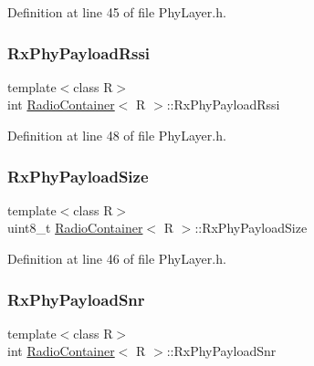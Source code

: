 Definition at line 45 of file Phy\+Layer.\+h.

\mbox{\label{class_radio_container_a198c252436c6a365cb07d9d073d9d50d}} 
\subsubsection{\texorpdfstring{Rx\+Phy\+Payload\+Rssi}{RxPhyPayloadRssi}}
{\footnotesize\ttfamily template$<$class R$>$ \\
int \mbox{\hyperlink{class_radio_container}{Radio\+Container}}$<$ R $>$\+::Rx\+Phy\+Payload\+Rssi}



Definition at line 48 of file Phy\+Layer.\+h.

\mbox{\label{class_radio_container_a2b84534ef69df6313c3c7cf9edcb234d}} 
\subsubsection{\texorpdfstring{Rx\+Phy\+Payload\+Size}{RxPhyPayloadSize}}
{\footnotesize\ttfamily template$<$class R$>$ \\
uint8\+\_\+t \mbox{\hyperlink{class_radio_container}{Radio\+Container}}$<$ R $>$\+::Rx\+Phy\+Payload\+Size}



Definition at line 46 of file Phy\+Layer.\+h.

\mbox{\label{class_radio_container_a8814f4b3203f8f9fac24e77291f41dd3}} 
\subsubsection{\texorpdfstring{Rx\+Phy\+Payload\+Snr}{RxPhyPayloadSnr}}
{\footnotesize\ttfamily template$<$class R$>$ \\
int \mbox{\hyperlink{class_radio_container}{Radio\+Container}}$<$ R $>$\+::Rx\+Phy\+Payload\+Snr}



